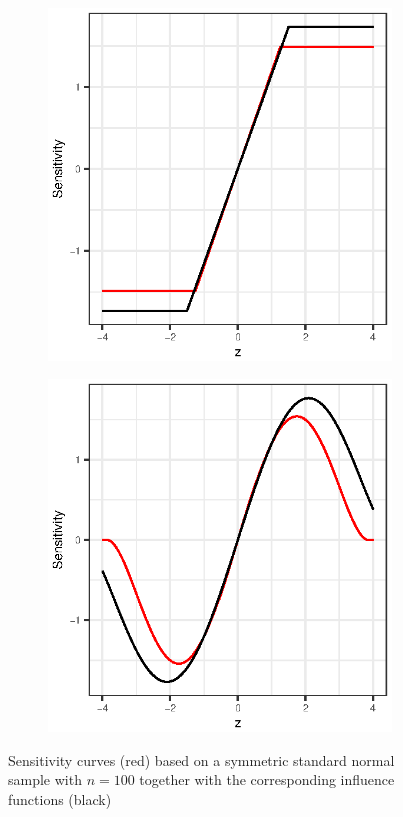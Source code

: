 \documentclass[titlepage]{article}
\begin{document}
\begin{figure}[!htb]
  \begin{subfigure}{0.5\linewidth}
    \centering
    \includegraphics{q1-sens_curves_huber_small}
  \end{subfigure}
  \begin{subfigure}{0.5\linewidth}
    \centering
    \includegraphics{q1-sens_curves_tukey_small}
  \end{subfigure}
  \caption{Sensitivity curves (red) based on a symmetric standard normal sample with $n = 100$ together with the corresponding influence functions (black)}
  \label{fig:q1-sens-curves-1e6}
\end{figure}
\end{document}

